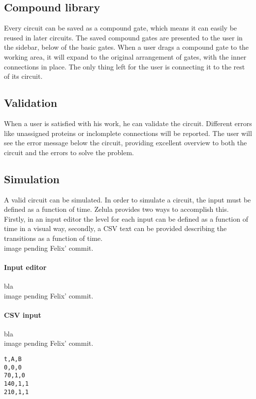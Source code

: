 \subsection{Compound library}
\begin{figure}[h!]
\centering{}
\end{figure}

\noindent Every circuit can be saved as a compound gate, which means it can easily be reused in later circuits. The saved compound gates are presented to the user in the sidebar, below of the basic gates. When a user drags a compound gate to the working area, it will expand to the original arrangement of gates, with the inner connections in place. The only thing left for the user is connecting it to the rest of its circuit.

\subsection{Validation}
When a user is satisfied with his work, he can validate the circuit. Different errors like unassigned proteins or inclomplete connections will be reported. The user will see the error message below the circuit, providing excellent overview to both the circuit and the errors to solve the problem.

\subsection{Simulation}
A valid circuit can be simulated. In order to simulate a circuit, the input must be defined as a function of time. Zelula provides two ways to accomplish this. Firstly, in an input editor the level for each input can be defined as a function of time in a visual way, secondly, a CSV text can be provided describing the transitions as a function of time.
\\
image pending Felix' commit.

\paragraph{Input editor}
bla \\
image pending Felix' commit.

\paragraph{CSV input}
bla \\
image pending Felix' commit.
\begin{verbatim}
t,A,B
0,0,0
70,1,0
140,1,1
210,1,1
\end{verbatim}

